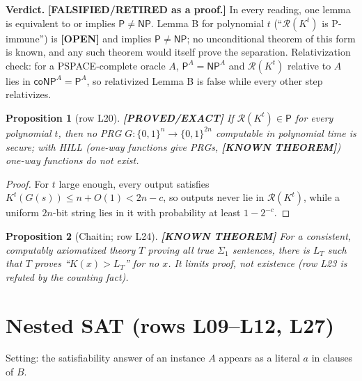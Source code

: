 \documentclass[11pt]{article}
\newtheorem{proposition}{Proposition}
\theoremstyle{remark}
\newcommand{\Kpt}{K^{t}}
\newcommand{\R}{\mathcal{R}}
\newcommand{\cP}{\mathsf{P}}
\newcommand{\NP}{\mathsf{NP}}
\newcommand{\coNP}{\mathsf{coNP}}
\newcommand{\status}[1]{\textbf{[#1]}}
\begin{document}
\noindent\textbf{Verdict.} \status{FALSIFIED/RETIRED as a proof.} In every reading, one lemma is
equivalent to or implies $\cP\neq\NP$. Lemma B for polynomial $t$ (``$\R(\Kpt)$ is P-immune'') is
\status{OPEN} and implies $\cP\neq\NP$; no unconditional theorem of this form is known, and any such
theorem would itself prove the separation. Relativization check: for a PSPACE-complete oracle $A$,
$\cP^A=\NP^A$ and $\R(\Kpt)$ relative to $A$ lies in $\coNP^A=\cP^A$, so relativized Lemma B is false
while every other step relativizes.

\begin{proposition}[row L20] \status{PROVED/EXACT}
If $\R(\Kpt)\in\cP$ for every polynomial $t$, then no PRG $G:\{0,1\}^n\to\{0,1\}^{2n}$ computable in
polynomial time is secure; with HILL (one-way functions give PRGs, \status{KNOWN THEOREM}) one-way
functions do not exist.
\end{proposition}
\begin{proof}
For $t$ large enough, every output satisfies $\Kpt(G(s))\le n+O(1)<2n-c$, so outputs never lie in
$\R(\Kpt)$, while a uniform $2n$-bit string lies in it with probability at least $1-2^{-c}$.
\end{proof}

\begin{proposition}[Chaitin; row L24] \status{KNOWN THEOREM}
For a consistent, computably axiomatized theory $T$ proving all true $\Sigma_1$ sentences, there is
$L_T$ such that $T$ proves ``$K(x)>L_T$'' for no $x$. It limits proof, not existence (row L23 is
refuted by the counting fact).
\end{proposition}

\section{Nested SAT (rows L09--L12, L27)}

Setting: the satisfiability answer of an instance $A$ appears as a literal $a$ in clauses of $B$.
\end{document}
